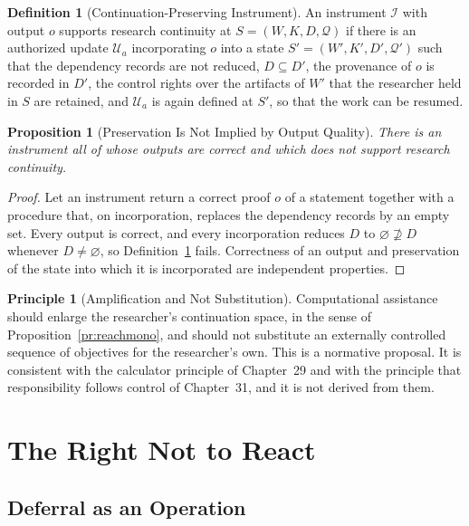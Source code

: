 \documentclass[11pt,letterpaper]{report}
\theoremstyle{plain}
\newtheorem{proposition}[theorem]{Proposition}
\theoremstyle{definition}
\newtheorem{definition}[theorem]{Definition}
\newtheorem{principle}[theorem]{Principle}
\theoremstyle{remark}
\begin{document}
\begin{definition}[Continuation-Preserving Instrument]\label{def:contpreserving}
An instrument $\mathcal I$ with output $o$ supports research continuity at $S=(W,K,D,\mathcal Q)$ if there is an authorized update $\mathcal U_a$ incorporating $o$ into a state $S'=(W',K',D',\mathcal Q')$ such that the dependency records are not reduced, $D\subseteq D'$, the provenance of $o$ is recorded in $D'$, the control rights over the artifacts of $W'$ that the researcher held in $S$ are retained, and $\mathcal U_a$ is again defined at $S'$, so that the work can be resumed.
\end{definition}

\begin{proposition}[Preservation Is Not Implied by Output Quality]\label{pr:preservenotquality}
There is an instrument all of whose outputs are correct and which does not support research continuity.
\end{proposition}
\begin{proof}
Let an instrument return a correct proof $o$ of a statement together with a procedure that, on incorporation, replaces the dependency records by an empty set. Every output is correct, and every incorporation reduces $D$ to $\varnothing\not\supseteq D$ whenever $D\ne\varnothing$, so Definition~\ref{def:contpreserving} fails. Correctness of an output and preservation of the state into which it is incorporated are independent properties.
\end{proof}

\begin{principle}[Amplification and Not Substitution]\label{pr:amplify}
Computational assistance should enlarge the researcher's continuation space, in the sense of Proposition~\ref{pr:reachmono}, and should not substitute an externally controlled sequence of objectives for the researcher's own. This is a normative proposal. It is consistent with the calculator principle of Chapter~29 and with the principle that responsibility follows control of Chapter~31, and it is not derived from them.
\end{principle}

\chapter{The Right Not to React}

\section{Deferral as an Operation}
\end{document}
